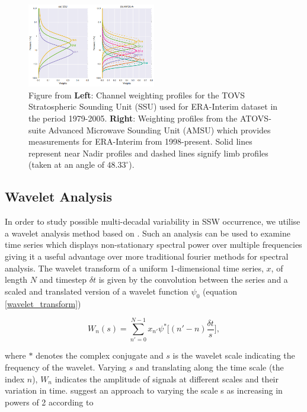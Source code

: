 \begin{figure}[h!]
\centering
    \includegraphics[width=0.5\textwidth]{Figures/Figures-origins/channels.png}
    \caption[Channel profiles for satellite retrievals assimilated by ERA-Interim]{Figure from \cite{Fujiwara17} \textbf{Left}: Channel weighting profiles for the TOVS Stratospheric Sounding Unit (SSU) used for ERA-Interim dataset in the period 1979-2005. \textbf{Right}: Weighting profiles from the ATOVS-suite Advanced Microwave Sounding Unit (AMSU) which provides measurements for ERA-Interim from 1998-present. Solid lines represent near Nadir profiles and dashed lines signify limb profiles (taken at an angle of $48.33^{\circ}$).}
    \label{fig:Satellite_channels}
\centering
\end{figure}

\subsection{Wavelet Analysis}
\label{sec:Wavelet_Analysis}
In order to study possible multi-decadal variability in SSW occurrence, we utilise a wavelet analysis method based on \cite{Torrence1998}. Such an analysis can be used to examine time series which displays non-stationary spectral power over multiple frequencies \citep{Daubechies} giving it a useful advantage over more traditional fourier methods for spectral analysis. The wavelet transform of a uniform 1-dimensional time series, $x$, of length $N$ and timestep $\delta t$ is given by the convolution between the series and a scaled and translated version of a wavelet function $\psi_0$ (equation \ref{wavelet_transform})

\begin{equation} \label{wavelet_transform}
W_n(s) = \sum^{N - 1}_{n' = 0} x_{n'} \psi^* \bigg[(n' - n) \frac{\delta t}{s}\bigg],
\end{equation}

where $*$ denotes the complex conjugate and $s$ is the wavelet scale indicating the frequency of the wavelet. Varying $s$ and translating along the time scale (the index $n$), $W_n$ indicates the amplitude of signals at different scales and their variation in time. \cite{Torrence1998} suggest an approach to varying the scale s as increasing in powers of 2 according to 

